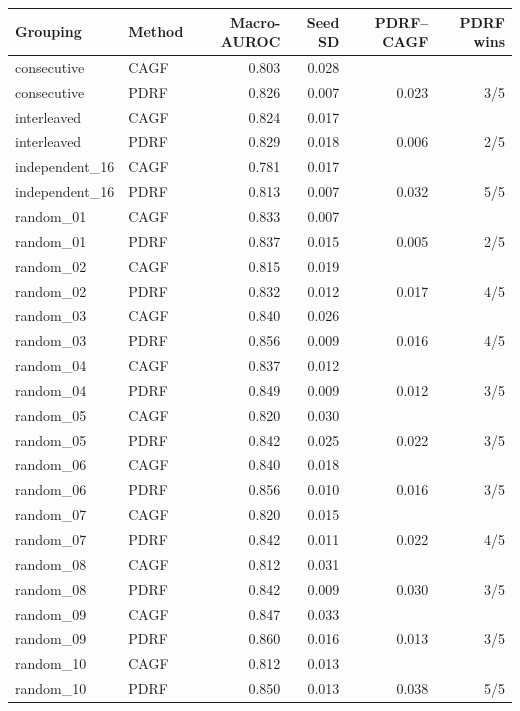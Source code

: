 \begin{tabular}{llrrrr}
\toprule
Grouping & Method & Macro-AUROC & Seed SD & PDRF--CAGF & PDRF wins\\
\midrule
consecutive & CAGF & 0.803 & 0.028 &  & \\
consecutive & PDRF & 0.826 & 0.007 & 0.023 & 3/5\\
interleaved & CAGF & 0.824 & 0.017 &  & \\
interleaved & PDRF & 0.829 & 0.018 & 0.006 & 2/5\\
independent\_16 & CAGF & 0.781 & 0.017 &  & \\
independent\_16 & PDRF & 0.813 & 0.007 & 0.032 & 5/5\\
random\_01 & CAGF & 0.833 & 0.007 &  & \\
random\_01 & PDRF & 0.837 & 0.015 & 0.005 & 2/5\\
random\_02 & CAGF & 0.815 & 0.019 &  & \\
random\_02 & PDRF & 0.832 & 0.012 & 0.017 & 4/5\\
random\_03 & CAGF & 0.840 & 0.026 &  & \\
random\_03 & PDRF & 0.856 & 0.009 & 0.016 & 4/5\\
random\_04 & CAGF & 0.837 & 0.012 &  & \\
random\_04 & PDRF & 0.849 & 0.009 & 0.012 & 3/5\\
random\_05 & CAGF & 0.820 & 0.030 &  & \\
random\_05 & PDRF & 0.842 & 0.025 & 0.022 & 3/5\\
random\_06 & CAGF & 0.840 & 0.018 &  & \\
random\_06 & PDRF & 0.856 & 0.010 & 0.016 & 3/5\\
random\_07 & CAGF & 0.820 & 0.015 &  & \\
random\_07 & PDRF & 0.842 & 0.011 & 0.022 & 4/5\\
random\_08 & CAGF & 0.812 & 0.031 &  & \\
random\_08 & PDRF & 0.842 & 0.009 & 0.030 & 3/5\\
random\_09 & CAGF & 0.847 & 0.033 &  & \\
random\_09 & PDRF & 0.860 & 0.016 & 0.013 & 3/5\\
random\_10 & CAGF & 0.812 & 0.013 &  & \\
random\_10 & PDRF & 0.850 & 0.013 & 0.038 & 5/5\\
\bottomrule
\end{tabular}
